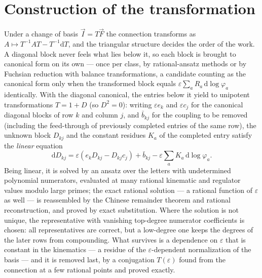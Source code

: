 \documentclass[11pt]{article}
\newcommand{\eps}{\varepsilon}
\newcommand{\dd}{\mathrm{d}}
\begin{document}
\section{Construction of the transformation}
Under a change of basis $\vec I = T\vec F$ the connection
transforms as $A \mapsto T^{-1}AT - T^{-1}\dd T$, and the
triangular structure decides the order of the work.  A diagonal
block never feels what lies below it, so each block is brought to
canonical form on its own --- once per class, by rational-ansatz
methods or by Fuchsian reduction with balance transformations, a
candidate counting as the canonical form only when the transformed
block equals $\eps\sum_a R_a\,\dd\log\varphi_a$ identically.  With
the diagonal canonical, the entries below it yield to unipotent
transformations $T = 1 + D$ (so $D^2 = 0$): writing $\eps e_k$ and
$\eps c_j$ for the canonical diagonal blocks of row $k$ and column
$j$, and $\bar b_{kj}$ for the coupling to be removed (including
the feed-through of previously completed entries of the same row),
the unknown block $D_{kj}$ and the constant residues $K_a$ of the
completed entry satisfy the \emph{linear} equation
\begin{equation}
  \dd D_{kj} = \eps( e_k D_{kj} - D_{kj} c_j ) + \bar b_{kj}
  - \eps \textstyle\sum_a K_a\, \dd\log\varphi_a .
\end{equation}
Being linear, it is solved by an ansatz over the letters with
undetermined polynomial numerators, evaluated at many rational
kinematic and regulator values modulo large primes; the exact
rational solution --- a rational function of $\eps$ as well --- is
reassembled by the Chinese remainder theorem and rational
reconstruction, and proved by exact substitution.  Where the
solution is not unique, the representative with vanishing
top-degree numerator coefficients is chosen: all representatives
are correct, but a low-degree one keeps the degrees of the later
rows from compounding.  What survives is a dependence on $\eps$
that is constant in the kinematics --- a residue of the
$\eps$-dependent normalization of the basis --- and it is removed
last, by a conjugation $T(\eps)$ found from the connection at a few
rational points and proved exactly.
\end{document}
